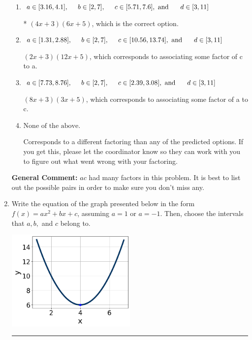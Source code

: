 \documentclass{extbook}[14pt]
\newcommand{\litem}[1]{\item #1

\rule{\textwidth}{0.4pt}}
\begin{document}
\begin{enumerate}
{\begin{enumerate}[label=\Alph*.]
 $(x + 18)(x + 20)$, which corresponds to factoring $x^{2} +38 x + 360$.
\item \( a \in [3.16, 4.1], \hspace*{5mm} b \in [2, 7], \hspace*{5mm} c \in [5.71, 7.6], \text{ and } \hspace*{5mm} d \in [3, 11] \)

* $(4x + 3)(6x + 5)$, which is the correct option.
\item \( a \in [1.31, 2.88], \hspace*{5mm} b \in [2, 7], \hspace*{5mm} c \in [10.56, 13.74], \text{ and } \hspace*{5mm} d \in [3, 11] \)

 $(2x + 3)(12x + 5)$, which corresponds to associating some factor of c to a.
\item \( a \in [7.73, 8.76], \hspace*{5mm} b \in [2, 7], \hspace*{5mm} c \in [2.39, 3.08], \text{ and } \hspace*{5mm} d \in [3, 11] \)

 $(8x + 3)(3x + 5)$, which corresponds to associating some factor of a to c.
\item \( \text{None of the above.} \)

 Corresponds to a different factoring than any of the predicted options. If you get this, please let the coordinator know so they can work with you to figure out what went wrong with your factoring.
\end{enumerate}

\textbf{General Comment:} $ac$ had many factors in this problem. It is best to list out the possible pairs in order to make sure you don't miss any.
}
\litem{
Write the equation of the graph presented below in the form $f(x)=ax^2+bx+c$, assuming  $a=1$ or $a=-1$. Then, choose the intervals that $a, b,$ and $c$ belong to.

\begin{center}
    \includegraphics[width=0.5\textwidth]{../Figures/quadraticGraphToEquationCopyA.png}
\end{center}




}
\end{enumerate}
\end{document}
